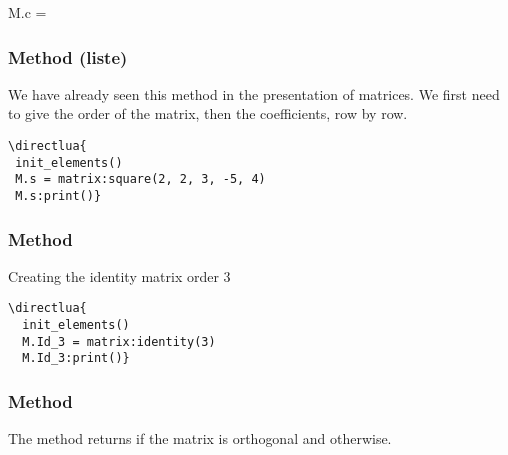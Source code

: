 \begin{mybox}

M.c = 
\end{mybox}

\subsubsection{Method (liste)}
\label{ssub:method_square}

We have already seen this method in the presentation of matrices. We first need to give the order of the matrix, then the coefficients, row by row.

\begin{minipage}{.5\textwidth}
\begin{verbatim}
\directlua{
 init_elements()
 M.s = matrix:square(2, 2, 3, -5, 4)
 M.s:print()}
\end{verbatim}
\end{minipage}
\begin{minipage}{.5\textwidth}
\end{minipage}

\subsubsection{Method }
\label{ssub:method_identity}

Creating the identity matrix order 3


\begin{minipage}{.5\textwidth}
\begin{verbatim}
\directlua{
  init_elements()
  M.Id_3 = matrix:identity(3)
  M.Id_3:print()}
\end{verbatim}
\end{minipage}
\begin{minipage}{.5\textwidth}
\end{minipage}

\subsubsection{Method  }
\label{ssub:method_is_orthogonal}

The method returns  if the matrix is orthogonal and  otherwise.

